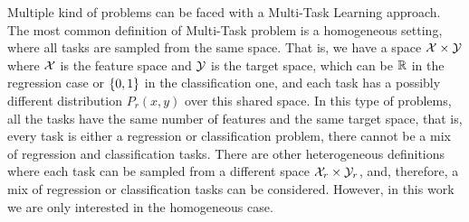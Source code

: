 Multiple kind of problems can be faced with a Multi-Task Learning approach. 
%
The most common definition of Multi-Task problem is a homogeneous setting, where all tasks are sampled from the same space. That is, we have a space $\mathcal{X} \times \mathcal{Y}$ where $\mathcal{X}$ is the feature space and $\mathcal{Y}$ is the target space, which can be $\mathbb{R}$ in the regression case or $\left\{0, 1\right\}$ in the classification one, and each task has a possibly different distribution $P_r(x, y)$ over this shared space.
In this type of problems, all the tasks have the same number of features and the same target space, that is, every task is either a regression or classification problem, there cannot be a mix of regression and classification tasks.
%
There are other heterogeneous definitions where each task can be sampled from a different space $\mathcal{X}_r \times \mathcal{Y}_r$, and, therefore, a mix of regression or classification tasks can be considered. However, in this work we are only interested in the homogeneous case.
%

